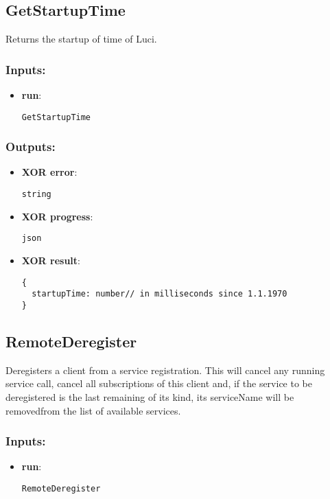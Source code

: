 \subsection{GetStartupTime}
\label{ch:builtinservices:GetStartupTime}
Returns the startup of time of Luci.
\subsubsection*{Inputs:}
\begin{itemize}
    \item \textbf{run}: 
\begin{lstlisting}
GetStartupTime
\end{lstlisting}
  \end{itemize}

\subsubsection*{Outputs:}
\begin{itemize}
    \item \textbf{XOR error}: 
\begin{lstlisting}
string
\end{lstlisting}
    \item \textbf{XOR progress}: 
\begin{lstlisting}
json
\end{lstlisting}
    \item \textbf{XOR result}: 
\begin{lstlisting}
{
  startupTime: number// in milliseconds since 1.1.1970
}
\end{lstlisting}
  \end{itemize}

\subsection{RemoteDeregister}
\label{ch:builtinservices:RemoteDeregister}
Deregisters
 a client from a service registration. This will cancel any running 
service call, cancel all subscriptions of this client and, if the 
service to be deregistered is the last remaining of its kind, its 
serviceName will be removedfrom the list of available services.
\subsubsection*{Inputs:}
\begin{itemize}
    \item \textbf{run}: 
\begin{lstlisting}
RemoteDeregister
\end{lstlisting}
  \end{itemize}

